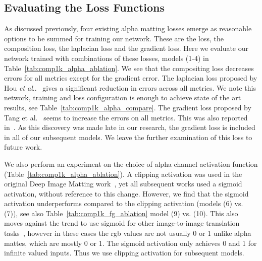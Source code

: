 \documentclass[runningheads]{llncs}
\makeatletter
\DeclareRobustCommand\onedot{\futurelet\@let@token\@onedot}
\def\@onedot{\ifx\@let@token.\else.\null\fi\xspace}
\def\etal{\emph{et al}\onedot}
\makeatother
\begin{document}
\subsection{Evaluating the  Loss Functions}
As discussed previously, four existing alpha matting losses emerge as reasonable options to be summed for training our network. These are the  loss, the composition loss, the laplacian loss and the gradient loss. Here we evaluate our network trained with combinations of these losses, models (1-4) in Table~\ref{tab:comp1k_alpha_ablation}. We see that the compositing loss decreases errors for all metrics except for the gradient error. The laplacian loss proposed by Hou \etal~\cite{ContextMatting} gives a significant reduction in errors across all metrics. We note this network, training and loss configuration is enough to achieve state of the art results, see Table~\ref{tab:comp1k_alpha_compare}. The gradient loss proposed by Tang et al.~\cite{LearningBasedSamplingMatting} seems to increase the errors on all metrics. This was also reported in~\cite{GCAMatting}. As this discovery was made late in our research, the gradient loss is included in all of our subsequent models. We leave the further examination of this loss to future work. 

We also perform an experiment on the choice of alpha channel activation function (Table~\ref{tab:comp1k_alpha_ablation}). A clipping activation was used in the original Deep Image Matting work~\cite{DeepImageMatting}, yet all subsequent works used a sigmoid activation, without reference to this change. However, we find that the sigmoid activation underperforms compared to the clipping activation (models (6) vs. (7)), see also Table~\ref{tab:comp1k_fg_ablation} model (9) vs. (10). This also moves against the trend to use sigmoid for other image-to-image translation tasks~\cite{pix2pix,gatedinpainting}, however in these cases the rgb values are not usually 0 or 1 unlike alpha mattes, which are mostly 0 or 1. The sigmoid activation only achieves 0 and 1 for infinite valued inputs. Thus we use clipping activation for subsequent models.  
\end{document}
